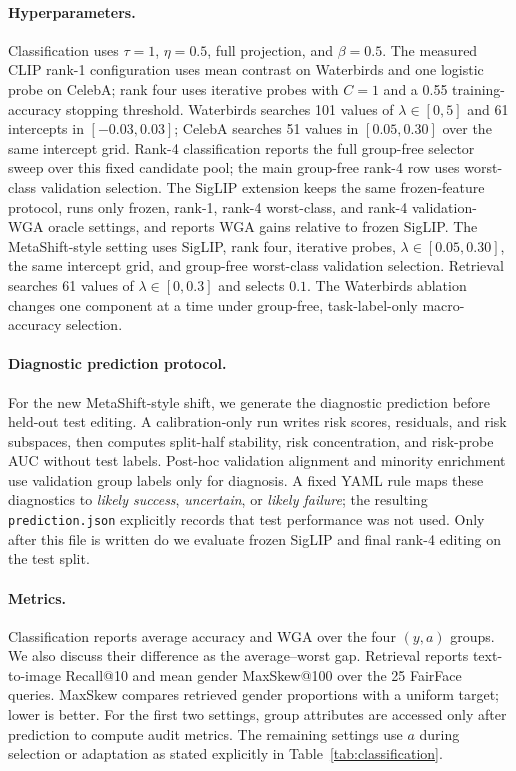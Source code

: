 \paragraph{Hyperparameters.}
Classification uses $\tau=1$, $\eta=0.5$, full projection, and $\beta=0.5$. The measured CLIP rank-1 configuration uses mean contrast on Waterbirds and one logistic probe on CelebA; rank four uses iterative probes with $C=1$ and a 0.55 training-accuracy stopping threshold. Waterbirds searches 101 values of $\lambda\in[0,5]$ and 61 intercepts in $[-0.03,0.03]$; CelebA searches 51 values in $[0.05,0.30]$ over the same intercept grid. Rank-4 classification reports the full group-free selector sweep over this fixed candidate pool; the main group-free rank-4 row uses worst-class validation selection. The SigLIP extension keeps the same frozen-feature protocol, runs only frozen, rank-1, rank-4 worst-class, and rank-4 validation-WGA oracle settings, and reports WGA gains relative to frozen SigLIP. The MetaShift-style setting uses SigLIP, rank four, iterative probes, $\lambda\in[0.05,0.30]$, the same intercept grid, and group-free worst-class validation selection. Retrieval searches 61 values of $\lambda\in[0,0.3]$ and selects $0.1$. The Waterbirds ablation changes one component at a time under group-free, task-label-only macro-accuracy selection.

\paragraph{Diagnostic prediction protocol.}
For the new MetaShift-style shift, we generate the diagnostic prediction before held-out test editing. A calibration-only run writes risk scores, residuals, and risk subspaces, then computes split-half stability, risk concentration, and risk-probe AUC without test labels. Post-hoc validation alignment and minority enrichment use validation group labels only for diagnosis. A fixed YAML rule maps these diagnostics to \emph{likely success}, \emph{uncertain}, or \emph{likely failure}; the resulting \texttt{prediction.json} explicitly records that test performance was not used. Only after this file is written do we evaluate frozen SigLIP and final rank-4 editing on the test split.

\paragraph{Metrics.}
Classification reports average accuracy and WGA over the four $(y,a)$ groups. We also discuss their difference as the average--worst gap. Retrieval reports text-to-image Recall@10 and mean gender MaxSkew@100 over the 25 FairFace queries. MaxSkew compares retrieved gender proportions with a uniform target; lower is better. For the first two settings, group attributes are accessed only after prediction to compute audit metrics. The remaining settings use $a$ during selection or adaptation as stated explicitly in Table~\ref{tab:classification}.
